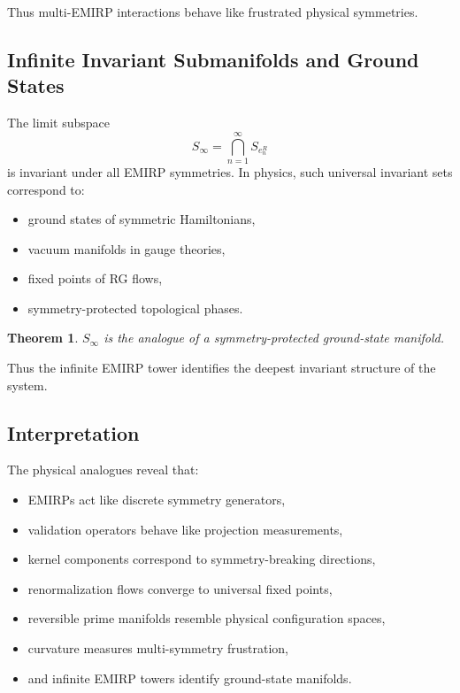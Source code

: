 \documentclass[11pt]{article}
\theoremstyle{definition}
\theoremstyle{plain}
\newtheorem{theorem}[definition]{Theorem}
\theoremstyle{remark}
\begin{document}
Thus multi-EMIRP interactions behave like frustrated physical symmetries.

\subsection{Infinite Invariant Submanifolds and Ground States}

The limit subspace
\[
S_\infty = \bigcap_{n=1}^\infty S_{e_n^R}
\]
is invariant under all EMIRP symmetries. In physics, such universal
invariant sets correspond to:

\begin{itemize}
    \item ground states of symmetric Hamiltonians,
    \item vacuum manifolds in gauge theories,
    \item fixed points of RG flows,
    \item symmetry-protected topological phases.
\end{itemize}

\begin{theorem}
$S_\infty$ is the analogue of a symmetry-protected ground-state
manifold.
\end{theorem}

Thus the infinite EMIRP tower identifies the deepest invariant structure
of the system.

\subsection{Interpretation}

The physical analogues reveal that:

\begin{itemize}
    \item EMIRPs act like discrete symmetry generators,
    \item validation operators behave like projection measurements,
    \item kernel components correspond to symmetry-breaking directions,
    \item renormalization flows converge to universal fixed points,
    \item reversible prime manifolds resemble physical configuration
    spaces,
    \item curvature measures multi-symmetry frustration,
    \item and infinite EMIRP towers identify ground-state manifolds.
\end{itemize}
\end{document}
